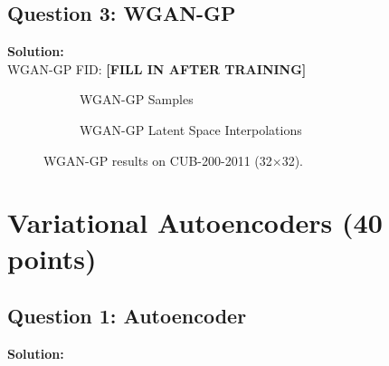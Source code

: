 \documentclass[11pt]{article}
\begin{document}
\subsection*{Question 3: WGAN-GP}

\textbf{Solution:}\\
WGAN-GP FID: \textbf{[FILL IN AFTER TRAINING]}

\begin{figure}[H]
  \centering
  \begin{subfigure}[b]{0.48\textwidth}
    \centering
    \fbox{\rule{0pt}{4cm}\rule{0.9\textwidth}{0pt}}
    \caption{WGAN-GP Samples}
  \end{subfigure}
  \hfill
  \begin{subfigure}[b]{0.48\textwidth}
    \centering
    \fbox{\rule{0pt}{4cm}\rule{0.9\textwidth}{0pt}}
    \caption{WGAN-GP Latent Space Interpolations}
  \end{subfigure}
  \caption{WGAN-GP results on CUB-200-2011 (32$\times$32).}
\end{figure}

\section{Variational Autoencoders (40 points)}

\subsection*{Question 1: Autoencoder}

\textbf{Solution:}
\end{document}
